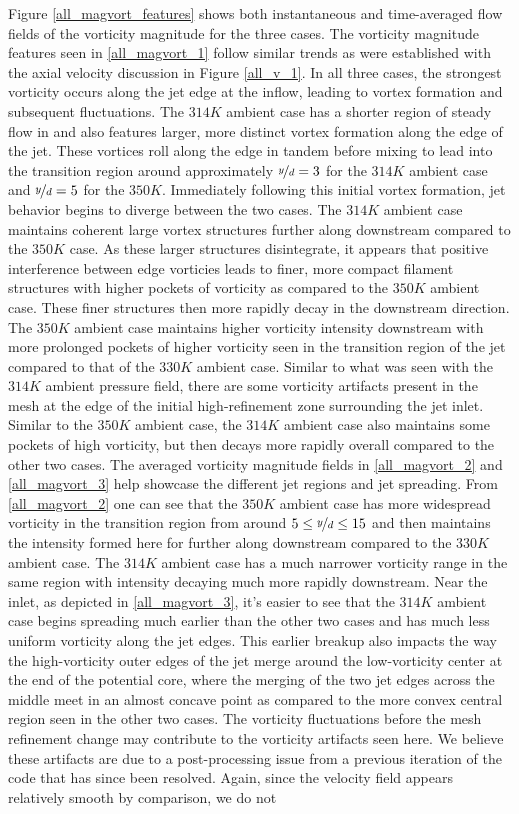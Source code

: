 Figure \ref{all_magvort_features} shows both instantaneous and time-averaged flow fields of the vorticity magnitude for the three cases. The vorticity magnitude features seen in \ref{all_magvort_1} follow similar trends as were established with the axial velocity discussion in Figure \ref{all_v_1}. In all three cases, the strongest vorticity occurs along the jet edge at the inflow, leading to vortex formation and subsequent fluctuations. The $314 K$ ambient case has a shorter region of steady flow in and also features larger, more distinct vortex formation along the edge of the jet. These vortices roll along the edge in tandem before mixing to lead into the transition region around approximately $\nicefrac{y}{d} = 3$ for the $314 K$ ambient case and $\nicefrac{y}{d} = 5$ for the $350 K$. Immediately following this initial vortex formation, jet behavior begins to diverge between the two cases. The $314 K$ ambient case maintains coherent large vortex structures further along downstream compared to the $350 K$ case. As these larger structures disintegrate, it appears that positive interference between edge vorticies leads to finer, more compact filament structures with higher pockets of vorticity as compared to the $350 K$ ambient case. These finer structures then more rapidly decay in the downstream direction. The $350 K$ ambient case maintains higher vorticity intensity downstream with more prolonged pockets of higher vorticity seen in the transition region of the jet compared to that of the $330 K$ ambient case. Similar to what was seen with the $314 K$ ambient pressure field, there are some vorticity artifacts present in the mesh at the edge of the initial high-refinement zone surrounding the jet inlet. Similar to the $350 K$ ambient case, the $314 K$ ambient case also maintains some pockets of high vorticity, but then decays more rapidly overall compared to the other two cases. The averaged vorticity magnitude fields in \ref{all_magvort_2} and \ref{all_magvort_3} help showcase the different jet regions and jet spreading. From \ref{all_magvort_2} one can see that the $350 K$ ambient case has more widespread vorticity in the transition region from around $5 \leq \nicefrac{y}{d} \leq 15$ and then maintains the intensity formed here for further along downstream compared to the $330 K$ ambient case. The $314 K$ ambient case has a much narrower vorticity range in the same region with intensity decaying much more rapidly downstream. Near the inlet, as depicted in \ref{all_magvort_3}, it's easier to see that the $314 K$ ambient case begins spreading much earlier than the other two cases and has much less uniform vorticity along the jet edges. This earlier breakup also impacts the way the high-vorticity outer edges of the jet merge around the low-vorticity center at the end of the potential core, where the merging of the two jet edges across the middle meet in an almost concave point as compared to the more convex central region seen in the other two cases. The vorticity fluctuations before the mesh refinement change may contribute to the vorticity artifacts seen here. We believe these artifacts are due to a post-processing issue from a previous iteration of the code that has since been resolved. Again, since the velocity field appears relatively smooth by comparison, we do not 